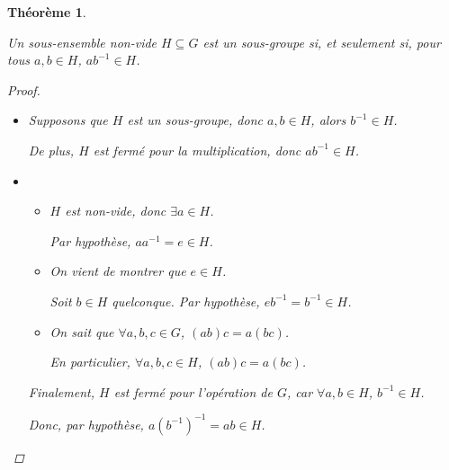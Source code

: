 \documentclass{report}
\newtheorem*{thm}{Th\'eor\`eme}
\theoremstyle{definition}
\theoremstyle{remark}
\begin{document}
	\begin{thm}~

		Un sous-ensemble non-vide $H \subseteq G$ est un sous-groupe si, et seulement si, pour tous $a,b \in H$, $ab^{-1} \in H$.
		\begin{proof}~

			\begin{itemize}
				\item[$(\Rightarrow)$] Supposons que $H$ est un sous-groupe, donc $a,b \in H$, alors $b^{-1} \in H$.

				De plus, $H$ est ferm\'e pour la multiplication, donc $ab^{-1} \in H$.
				\item[$(\Leftarrow)$]
				\begin{itemize}
					\item[$(N)$] $H$ est non-vide, donc $\exists a \in H$.

					Par hypoth\`ese, $aa^{-1}=e \in H$.
					\item[$(I)$] On vient de montrer que $e \in H$.

					Soit $b \in H$ quelconque. Par hypoth\`ese, $eb^{-1}=b^{-1} \in H$.
					\item[$(A)$] On sait que $\forall a,b,c \in G$, $(ab)c=a(bc)$.

					En particulier, $\forall a,b,c \in H$, $(ab)c=a(bc)$.
				\end{itemize}

				Finalement, $H$ est ferm\'e pour l'op\'eration de $G$, car $\forall a,b \in H$, $b^{-1} \in H$.

				Donc, par hypoth\`ese, $a(b^{-1})^{-1}=ab \in H$.
			\end{itemize}
		\end{proof}
	\end{thm}
\end{document}
